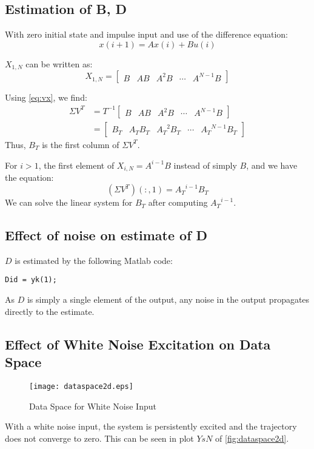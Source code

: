 \documentclass[11pt,a4paper]{article}
\begin{document}
\subsection{Estimation of B, D}
With zero initial state and impulse input and use of the difference equation:
\begin{equation}
    \label{eq:diffeq}
    x(i + 1) = Ax(i) + Bu(i)
\end{equation}

$X_{1, N}$ can be written as:
\begin{equation}
    \label{eq:simpxhankel}
    X_{1, N} = \begin{bmatrix}
        B & AB & A^2B & \cdots & A^{N-1}B
    \end{bmatrix}
\end{equation}

Using \autoref{eq:vx}, we find:
\begin{align}
    \Sigma V^T &= T^{-1} \begin{bmatrix}
        B & AB & A^2B & \cdots & A^{N-1}B \end{bmatrix} \\
    &= \begin{bmatrix}
        B_T & A_TB_T & {A_T}^2B_T & \cdots & {A_T}^{N-1}B_T \end{bmatrix}
\end{align}
Thus, $B_T$ is the first column of $\Sigma V^T$.

For $i > 1$, the first element of $X_{i, N} = A^{i - 1}B$ instead of simply
$B$, and we have the equation:
\begin{equation}
    (\Sigma V^T)(:, 1) = {A_T}^{i - 1}B_T
\end{equation}
We can solve the linear system for $B_T$ after computing ${A_T}^{i-1}$.

\subsection{Effect of noise on estimate of D}
$D$ is estimated by the following Matlab code:
\begin{lstlisting}
Did = yk(1);
\end{lstlisting}
As $D$ is simply a single element of the output, any noise in the output
propagates directly to the estimate.

\subsection{Effect of White Noise Excitation on Data Space}
\begin{figure}
    \centering
    \texttt{[image: dataspace2d.eps]}
    \caption{Data Space for White Noise Input}
    \label{fig:dataspace2d}
\end{figure}
With a white noise input, the system is persistently excited and the trajectory
does not converge to zero. This can be seen in plot $YsN$ of
\autoref{fig:dataspace2d}.
\end{document}
